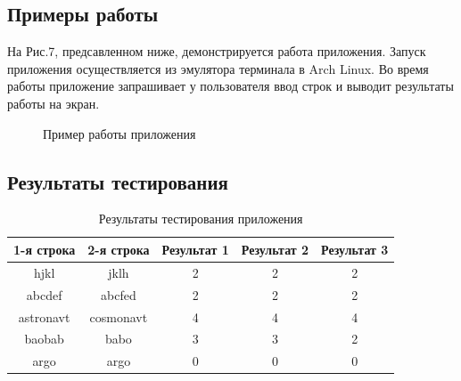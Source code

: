 \documentclass[a4paper,12pt]{article}
\begin{document}
\newpage
\subsection{Примеры работы}
\begin{flushleft}
На Рис.7, предсавленном ниже, демонстрируется работа приложения. Запуск приложения осуществляется из эмулятора терминала в Arch Linux. Во время работы приложение запрашивает у пользователя ввод строк и выводит результаты работы на экран.
\end{flushleft}
\begin{figure}[h]
\caption{Пример работы приложения}
\label{images:example}
\end{figure}

\newpage
\subsection{Результаты тестирования}
\begin{table}[h]
\caption{\label{tablice:tests}Результаты тестирования приложения}
\begin{center}
\begin{tabular}{|c|c|c|c|c|}
\hline
1-я строка & 2-я строка & Результат 1 & Результат 2 & Результат 3 \\ 
\hline
hjkl & jklh & 2 & 2 & 2 \\ 
\hline
abcdef & abcfed & 2 & 2 & 2 \\ 
\hline
astronavt & cosmonavt & 4 & 4 & 4 \\ 
\hline
baobab & babo & 3 & 3 & 2 \\ 
\hline
argo & argo & 0 & 0 & 0 \\ 
\hline
\end{tabular}
\end{center} 
\end{table}
\end{document}
